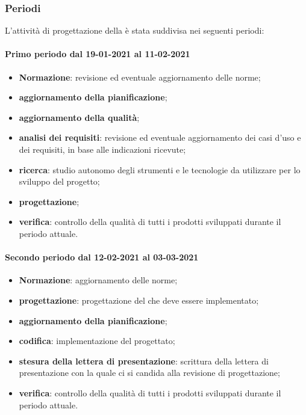 \subsubsection{Periodi}
L'attività di progettazione della  è stata suddivisa nei seguenti periodi:

\paragraph{Primo periodo dal 19-01-2021 al 11-02-2021}
\begin{itemize}
	\item \textbf{Normazione}: revisione ed eventuale aggiornamento delle norme;
	\item \textbf{aggiornamento della pianificazione};
	\item \textbf{aggiornamento della qualità};
	\item \textbf{analisi dei requisiti}: revisione ed eventuale aggiornamento dei casi d’uso e dei requisiti, in base alle indicazioni ricevute;
	\item \textbf{ricerca}: studio autonomo degli strumenti e le tecnologie da utilizzare per lo sviluppo del
	progetto;
	\item \textbf{progettazione};
	\item \textbf{verifica}: controllo della qualità di tutti i prodotti sviluppati durante il periodo attuale.
\end{itemize}

\paragraph{Secondo periodo dal 12-02-2021 al 03-03-2021}
\begin{itemize}
	\item \textbf{Normazione}: aggiornamento delle norme;
	\item \textbf{progettazione}: progettazione del  che deve essere implementato;
	\item \textbf{aggiornamento della pianificazione};
	\item \textbf{codifica}: implementazione del  progettato;
	\item \textbf{stesura della lettera di presentazione}: scrittura della lettera di presentazione con la quale ci
	si candida alla revisione di progettazione;
	\item \textbf{verifica}: controllo della qualità di tutti i prodotti sviluppati durante il periodo attuale.
\end{itemize}

